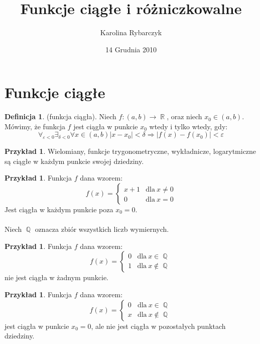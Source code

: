 \documentclass[12pt,a4paper]{article}
\title{Funkcje ciągłe i różniczkowalne}
\date{14 Grudnia 2010}
\author{Karolina Rybarczyk}
\theoremstyle{definition}
\newtheorem{df}[tw]{Definicja}
\newtheorem{ex}[tw]{Przykład}
\DeclareMathOperator{\R}{\mathbb{R}}
\DeclareMathOperator{\Q}{\mathbb{Q}}
\begin{document}
 
\maketitle

\tableofcontents

\section{Funkcje ciągłe}

\begin{df}
(funkcja ciągła). Niech $f:(a,b)\to\R$, oraz niech $x_0\in(a,b)$. Mówimy, że funkcja
$f$ jest ciągła w punkcie $x_0$ wtedy i tylko wtedy, gdy:
\[\forall_{\varepsilon<0}\exists_{\delta<0}\forall
x\in(a,b)|x-x_0|<\delta\Rightarrow|f(x)-f(x_0)|<\varepsilon\]
\end{df}

\begin{ex}
Wielomiany, funkcje trygonometryczne, wykładnicze, logarytmiczne są ciągłe w każdym
punkcie swojej dziedziny.
\end{ex}

\begin{ex}
Funkcja $f$ dana wzorem:
\[f(x)=\left\{\begin{array}{ll}x+1&\mbox{dla}\ x\neq0\\0&\mbox{dla}\
x=0\end{array}\right.\]
Jest ciągła w każdym punkcie poza $x_0 = 0$.
\\\\ Niech $\Q$ oznacza zbiór wszystkich liczb wymiernych.
\end{ex}

\begin{ex}
Funkcja $f$ dana wzorem:
\[f(x)=\left\{\begin{array}{ll}0&\mbox{dla}\ x\in\Q\\1&\mbox{dla}\
x\not\in\Q\end{array}\right.\]
nie jest ciągła w żadnym punkcie.
\end{ex}

\begin{ex}
Funkcja $f$ dana wzorem:
\[f(x)=\left\{\begin{array}{ll}0&\mbox{dla}\ x\in\Q\\x&\mbox{dla}\
x\not\in\Q\end{array}\right.\]
jest ciągła w punkcie $x_0=0$, ale nie jest ciągła w pozostałych punktach dziedziny.
\end{ex}
\end{document}
